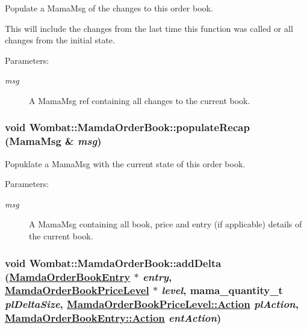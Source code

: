 Populate a Mama\-Msg of the changes to this order book. 

This will include the changes from the last time this function was called or all changes from the initial state. \begin{Desc}
\item[Parameters:]
\begin{description}
\item[{\em msg}]A Mama\-Msg ref containing all changes to the current book. \end{description}
\end{Desc}
\hypertarget{classWombat_1_1MamdaOrderBook_a271c067c845a6d73ea69fba6e701320}{
\subsubsection[populateRecap]{\setlength{\rightskip}{0pt plus 5cm}void Wombat::Mamda\-Order\-Book::populate\-Recap (Mama\-Msg \& {\em msg})}}
\label{classWombat_1_1MamdaOrderBook_a271c067c845a6d73ea69fba6e701320}


Popuklate a Mama\-Msg with the current state of this order book. 

\begin{Desc}
\item[Parameters:]
\begin{description}
\item[{\em msg}]A Mama\-Msg containing all book, price and entry (if applicable) details of the current book. \end{description}
\end{Desc}
\hypertarget{classWombat_1_1MamdaOrderBook_a1a9d7495d9b482e5f7f01bc34832820}{
\subsubsection[addDelta]{\setlength{\rightskip}{0pt plus 5cm}void Wombat::Mamda\-Order\-Book::add\-Delta (\hyperlink{classWombat_1_1MamdaOrderBookEntry}{Mamda\-Order\-Book\-Entry} $\ast$ {\em entry}, \hyperlink{classWombat_1_1MamdaOrderBookPriceLevel}{Mamda\-Order\-Book\-Price\-Level} $\ast$ {\em level}, mama\_\-quantity\_\-t {\em pl\-Delta\-Size}, \hyperlink{classWombat_1_1MamdaOrderBookPriceLevel_bd3407b4250fc6f7a42d94b6d32e358a}{Mamda\-Order\-Book\-Price\-Level::Action} {\em pl\-Action}, \hyperlink{classWombat_1_1MamdaOrderBookEntry_fc6cb1d67c7601d093a36f59cf9bcef4}{Mamda\-Order\-Book\-Entry::Action} {\em ent\-Action})}}
\label{classWombat_1_1MamdaOrderBook_a1a9d7495d9b482e5f7f01bc34832820}


